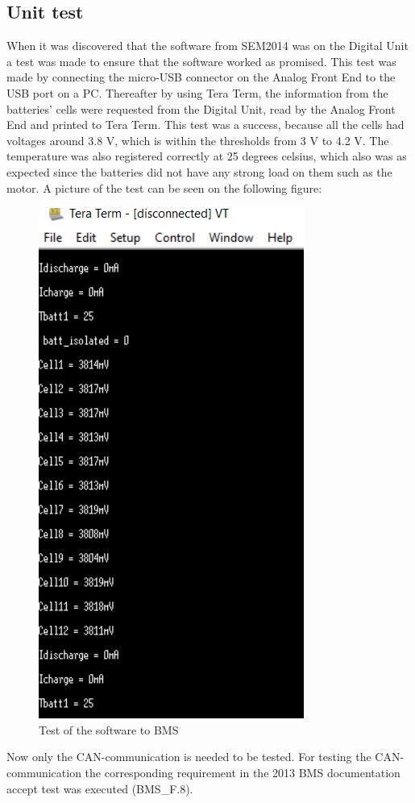 \subsection{Unit test}
When it was discovered that the software from SEM2014 was on the Digital Unit a test was made to ensure that the software worked as promised. This test was made by connecting the micro-USB connector on the Analog Front End to the USB port on a PC. Thereafter by using Tera Term, the information from the batteries' cells were requested from the Digital Unit, read by the Analog Front End and printed to Tera Term. This test was a success, because all the cells had voltages around 3.8 V, which is within the thresholds from 3 V to 4.2 V.
The temperature was also registered correctly at 25 degrees celsius, which also was as expected since the batteries did not have any strong load on them such as the motor.
A picture of the test can be seen on the following figure:\\
\begin{figure}[H]
	\centering
	\includegraphics[width=0.5\linewidth]{Software/BMS_teraterm_test.PNG}
	\caption{Test of the software to BMS}
	\label{fig:SoftwareTest_teraterm_BMS}
\end{figure}

Now only the CAN-communication is needed to be tested. For testing the CAN-communication the corresponding requirement in the 2013 BMS documentation accept test was executed (BMS\_F.8).

